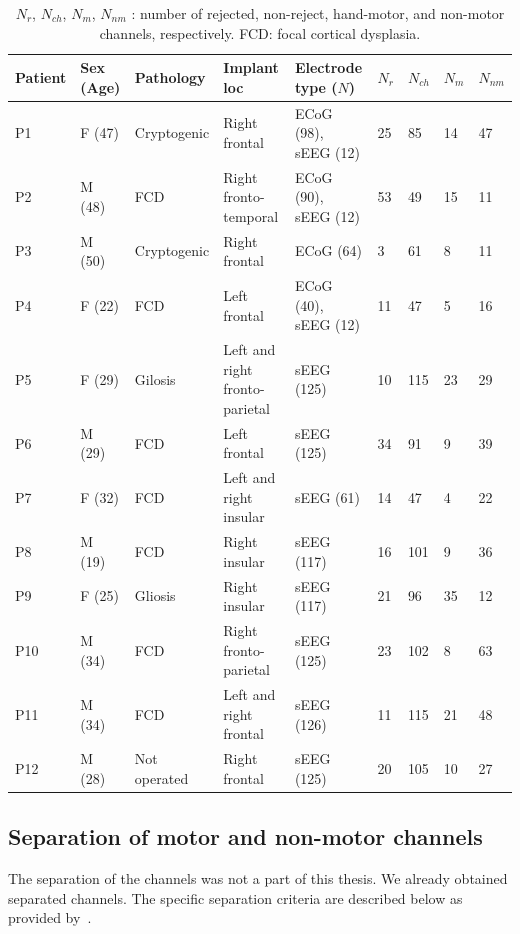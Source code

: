 \begin{table}[!htbp]
\centering
\begin{tabular}{|p{1.3cm}|p{1.05cm}|p{2.15cm}|p{2.2cm}|p{1.8cm}|p{0.5cm}|p{0.65cm}|p{0.6cm}|p{0.8cm}|}
\toprule
Patient&Sex (Age)&Pathology&Implant loc&Electrode type ($N$) & $N_r$ & $N_{ch}$ & $N_{m}$ & $N_{nm}$ \\
\hline
\midrule
P1 & F (47) & Cryptogenic & Right frontal & ECoG (98),  sEEG (12) & 25 & 85 & 14 & 47 \\
\hline
P2 & M (48) & FCD & Right fronto-temporal & ECoG (90), sEEG (12) & 53 & 49 & 15 & 11 \\
\hline
P3 & M (50) & Cryptogenic & Right frontal & ECoG (64) & 3 & 61 & 8 & 11 \\
\hline
P4 & F (22) & FCD & Left frontal & ECoG (40),  sEEG (12) & 11 & 47 & 5 & 16 \\
\hline
P5 & F (29) & Gilosis & Left and right fronto-parietal &  sEEG (125) & 10 & 115 & 23 & 29 \\
\hline
P6 & M (29) & FCD & Left frontal &  sEEG (125) & 34 & 91 & 9 & 39 \\
\hline
P7 & F (32) & FCD & Left and right insular &  sEEG (61) & 14 & 47 & 4 & 22 \\
\hline
P8 & M (19) & FCD & Right insular &  sEEG (117) & 16 & 101 & 9 & 36 \\
\hline
P9 & F (25) & Gliosis & Right insular &  sEEG (117) & 21 & 96 & 35 & 12 \\
\hline
P10 & M (34) & FCD & Right fronto-parietal &  sEEG (125) & 23 & 102 & 8 & 63 \\
\hline
P11 & M (34) & FCD & Left and right frontal &  sEEG (126) & 11 & 115 & 21 & 48 \\
\hline
P12 & M (28) & Not operated & Right frontal &  sEEG (125) & 20 & 105 & 10 & 27 \\
\bottomrule
\end{tabular}
\caption[Patient details]{$N_r$, $N_{ch}$, $N_{m}$, $N_{nm}$  : number of rejected, non-reject, hand-motor, and non-motor channels, respectively. FCD: focal cortical dysplasia.}
\label{tab:patient-table}
\end{table}

\subsection{Separation of motor and non-motor channels}\label{subsec:separation-of-motor-and-non-motor-channels}
The separation of the channels was not a part of this thesis. 
We already obtained separated channels.
The specific separation criteria are described below as provided by~\cite{Hammer-2021}. \\

